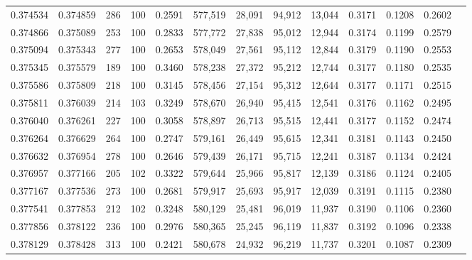 \begin{tabular}{rrrrrrrrrrrrr}
0.374534 & 0.374859 &   286 & 100 &                                     0.2591 & 577,519 &  28,091 &  94,912 &  13,044 & 0.3171 & 0.1208 & 0.2602 \\
0.374866 & 0.375089 &   253 & 100 &                                     0.2833 & 577,772 &  27,838 &  95,012 &  12,944 & 0.3174 & 0.1199 & 0.2579 \\
0.375094 & 0.375343 &   277 & 100 &                                     0.2653 & 578,049 &  27,561 &  95,112 &  12,844 & 0.3179 & 0.1190 & 0.2553 \\
0.375345 & 0.375579 &   189 & 100 &                                     0.3460 & 578,238 &  27,372 &  95,212 &  12,744 & 0.3177 & 0.1180 & 0.2535 \\
0.375586 & 0.375809 &   218 & 100 &                                     0.3145 & 578,456 &  27,154 &  95,312 &  12,644 & 0.3177 & 0.1171 & 0.2515 \\
0.375811 & 0.376039 &   214 & 103 &                                     0.3249 & 578,670 &  26,940 &  95,415 &  12,541 & 0.3176 & 0.1162 & 0.2495 \\
0.376040 & 0.376261 &   227 & 100 &                                     0.3058 & 578,897 &  26,713 &  95,515 &  12,441 & 0.3177 & 0.1152 & 0.2474 \\
0.376264 & 0.376629 &   264 & 100 &                                     0.2747 & 579,161 &  26,449 &  95,615 &  12,341 & 0.3181 & 0.1143 & 0.2450 \\
0.376632 & 0.376954 &   278 & 100 &                                     0.2646 & 579,439 &  26,171 &  95,715 &  12,241 & 0.3187 & 0.1134 & 0.2424 \\
0.376957 & 0.377166 &   205 & 102 &                                     0.3322 & 579,644 &  25,966 &  95,817 &  12,139 & 0.3186 & 0.1124 & 0.2405 \\
0.377167 & 0.377536 &   273 & 100 &                                     0.2681 & 579,917 &  25,693 &  95,917 &  12,039 & 0.3191 & 0.1115 & 0.2380 \\
0.377541 & 0.377853 &   212 & 102 &                                     0.3248 & 580,129 &  25,481 &  96,019 &  11,937 & 0.3190 & 0.1106 & 0.2360 \\
0.377856 & 0.378122 &   236 & 100 &                                     0.2976 & 580,365 &  25,245 &  96,119 &  11,837 & 0.3192 & 0.1096 & 0.2338 \\
0.378129 & 0.378428 &   313 & 100 &                                     0.2421 & 580,678 &  24,932 &  96,219 &  11,737 & 0.3201 & 0.1087 & 0.2309 \\

\end{tabular}
